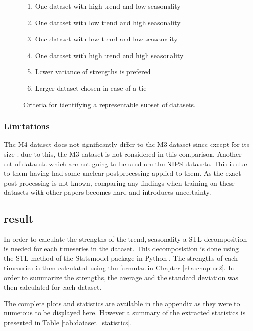 \begin{figure}[h]
  \begin{enumerate}
    \item One dataset with high trend and low seasonality
    \item One dataset with low trend and high seasonality
    \item One dataset with low trend and low seasonality
    \item One dataset with high trend and high seasonality
    \item Lower variance of strengths is prefered
    \item Larger dataset chosen in case of a tie
  \end{enumerate}
  \caption{Criteria for identifying a representable subset of datasets.}
  \label{dataset_criteria}
\end{figure}


\subsubsection{Limitations}
The M4 dataset does not significantly differ to the M3 dataset since except for its size \cite{m3_vs_M4}. due to this, the M3 dataset is not considered in this comparison. Another set of datasets which are not going to be used are the NIPS datasets. This is due to them having had some unclear postprocessing applied to them. As the exact post processing is not known, comparing any findings when training on these datasets with other papers becomes hard and introduces uncertainty.

\subsection{result}
In order to calculate the strengths of the trend, seasonality a STL decomposition is needed for each timeseries in the dataset. This decomposistion is done using the STL method of the Statsmodel package in Python \cite{seabold2010statsmodels}. The strengths of each timeseries is then calculated using the formulas in Chapter \ref{cha:chapter2}. In order to summarize the strengths, the average and the standard deviation was then calculated for each dataset.

The complete plots and statistics are available in the appendix as they were to numerous to be displayed here. However a summary of the extracted statistics is presented in Table \ref{tab:dataset_statistics}.


